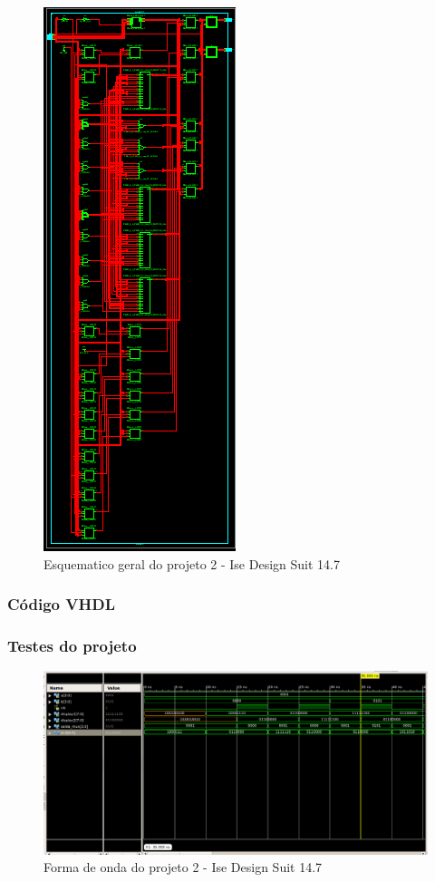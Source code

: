 \documentclass[12pts]{article}
\begin{document}
\clearpage

\begin{figure}[!htb]
  \centering
  \includegraphics[scale=0.7	]{imagens/esquematico_projeto2}
  \caption{Esquematico geral do projeto 2 - Ise Design Suit 14.7}
  \label{figRotulo}
\end{figure}


\clearpage
\subsubsection{Código VHDL}



\clearpage
\subsubsection{Testes do projeto}

\begin{figure}[!htb]
  \centering
  \includegraphics[scale=0.35	]{imagens/onda_projeto2}
  \caption{Forma de onda do projeto 2 - Ise Design Suit 14.7}
  \label{figRotulo}
\end{figure}
\end{document}
